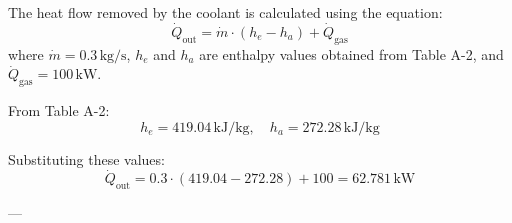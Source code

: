 The heat flow removed by the coolant is calculated using the equation:  
\[
\dot{Q}_{\text{out}} = \dot{m} \cdot (h_e - h_a) + \dot{Q}_{\text{gas}}
\]  
where \( \dot{m} = 0.3 \, \text{kg/s} \), \( h_e \) and \( h_a \) are enthalpy values obtained from Table A-2, and \( \dot{Q}_{\text{gas}} = 100 \, \text{kW} \).  

From Table A-2:  
\[
h_e = 419.04 \, \text{kJ/kg}, \quad h_a = 272.28 \, \text{kJ/kg}
\]  

Substituting these values:  
\[
\dot{Q}_{\text{out}} = 0.3 \cdot (419.04 - 272.28) + 100 = 62.781 \, \text{kW}
\]  

---